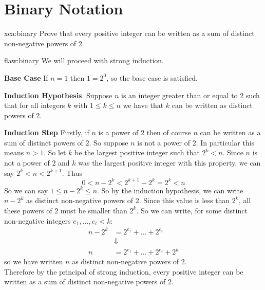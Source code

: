 \section{Binary Notation}

\begin{xca}{xca:binary}
Prove that every positive integer can be written as a sum of distinct non-negative powers of $2$. 
\end{xca}

\begin{flaw}{flaw:binary} %
We will proceed with strong induction. 

\textbf{Base Case} If $n = 1$ then $1 = 2^0$, so the base case is satisfied. 

\textbf{Induction Hypothesis}. Suppose $n$ is an integer greater than or equal to $2$ such that for all integers $k$ with $1 \leq k \leq n$ we have that $k$ can be written as distinct powers of $2$. 


\textbf{Induction Step} Firstly, if $n$ is a power of $2$ then of course $n$ can be written as a sum of distinct powers of $2$. So suppose $n$ is not a power of $2$. In particular this means $n > 1$. So let $k$ be the largest positive integer such that $2^k < n$. Since $n$ is not a power of $2$ and $k$ was the largest positive integer with this property, we can say $2^k < n < 2^{k+1}$. Thus 
$$0 < n - 2^k < 2^{k+1}- 2^k = 2^k < n $$
So we can say $1 \leq n-2^k \leq n$. So by the induction hypothesis, we can write $n-2^k$ as distinct non-negative powers of $2$. Since this value is less than $2^k$, all these powers of $2$ must be smaller than $2^k$. So we can write, for some distinct non-negative integers $e_1, ..., e_t < k$:
\begin{align*}
    n - 2^k &= 2^{e_1} + ... + 2^{e_t}\\
    &\Downarrow\\
    n &= 2^{e_1} + ... + 2^{e_t} + 2^k
\end{align*}
so we have written $n$ as distinct non-negative powers of $2$. \\

Therefore by the principal of strong induction, every positive integer can be written as a sum of distinct non-negative powers of $2$. 
\end{flaw}

